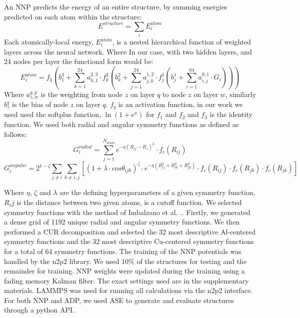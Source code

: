\documentclass{article}
\begin{document}
An NNP predicts the energy of an entire structure, by summing energies predicted on each atom within the structure: 
\begin{equation}
E^{structure} = \sum_i E^{atom}_i
\end{equation}
Each atomically-local energy, $E^{atom}_i$, is a nested hierarchical function of weighted layers across the neural network.
Where In our case, with two hidden layers, and 24 nodes per layer the functional form would be:
\begin{equation}
E^{atom}_i = f_3 ( b^3_1+\sum^{24}_{k=1}a^{2,3}_{k,1}\cdot f^2_k(b^2_k+\sum^{24}_{j=1}a^{1,2}_{j,k}\cdot f^1_j ( b^1_j + \sum^{64}_{i=1} a^{0,1}_{i,j}\cdot G_i  ))) 
\end{equation}
Where $a^{q,p}_{z,w}$ is the weighting from node $z$ on layer $q$ to node $z$ on layer $w$, similarly $b^q_z$ is
the bias of node $z$ on layer $q$. $f_q$ is an activation function, in our work we used used the softplus function,
$\ln (1 + \mathrm{e}^x)$ for $f_1$ and $f_2$ and $f_3$ is the identity function. 
We used both radial and angular symmetry functions as  defined as follows:
\begin{equation}
G^{radial}_i = \sum^{N_{atom}}_{j=1}e^{-\eta(R_{ij}-R_{s})^2}\cdot f_c(R_{ij})
\end{equation}
\begin{equation}
G^{angular}_i = 2^{1-\zeta}\sum_{j\neq i}\sum_{k\neq i,j}[ (1+\lambda\cdot cos\theta_{ijk})^\zeta \cdot e^{-\eta(R^2_{ij}+R^2_{ik}+R^2_{jk})}\cdot f_c(R_{ij}) \cdot f_c(R_{jk}) \cdot f_c(R_{jk}) ]
\end{equation}

Where $\eta$, $\zeta$ and $\lambda$ are the defining hyperparameters of a given symmetry function, $R_ij$ is the distance between two given atoms, is a cutoff function. 
We selected symmetry functions with the method of Imbalzano et al. .\cite{Imbalzano2018}.
Firstly, we generated a dense grid of 1192 unique radial and angular symmetry functions.
We then performed a CUR decomposition and selected the 32 most descriptive Al-centered symmetry functions and the 32 most descriptive Cu-centered symmetry functions for a total of 64 symmetry functions.
The training of the NNP potentials was handled by the n2p2 library\cite{Singraber2019ParallelPotentials}\cite{Singraber2019Library-BasedPotentials}.
We used 10\% of the structures for testing and the remainder for training.
NNP weights were updated during the training using a fading memory Kalman filter.
The exact settings used are in the supplementary materials.
LAMMPS\cite{Plimpton1995} was used for running all calculations via the n2p2 interface. 
For both NNP and ADP, we used ASE\cite{HjorthLarsen2017} to generate and evaluate structures through a python API. 
\end{document}
